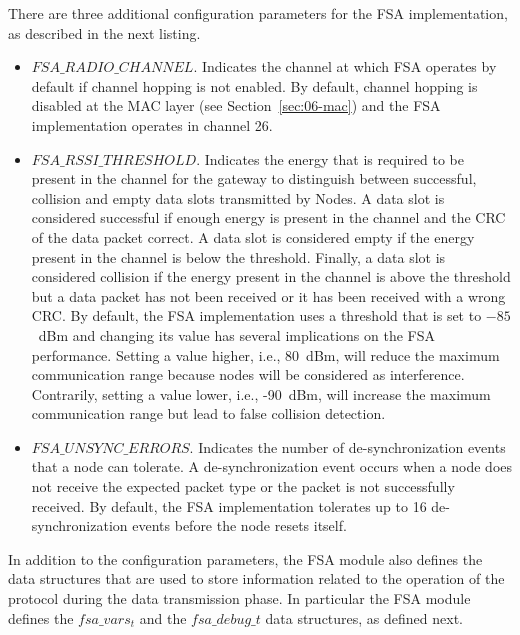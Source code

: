 There are three additional configuration parameters for the FSA implementation, as described in the next listing.
\begin{itemize}
\item $FSA\_RADIO\_CHANNEL$. Indicates the channel at which FSA operates by default if channel hopping is not enabled. By default, channel hopping is disabled at the MAC layer (see Section~\ref{sec:06-mac}) and the FSA implementation operates in channel 26.
\item $FSA\_RSSI\_THRESHOLD$. Indicates the energy that is required to be present in the channel for the gateway to distinguish between successful, collision and empty data slots transmitted by Nodes. A data slot is considered successful if enough energy is present in the channel and the CRC of the data packet correct. A data slot is considered empty if the energy present in the channel is below the threshold. Finally, a data slot is considered collision if the energy present in the channel is above the threshold but a data packet has not been received or it has been received with a wrong CRC. By default, the FSA implementation uses a threshold that is set to $-85$~dBm and changing its value has several implications on the FSA performance. Setting a value higher, i.e., 80~dBm, will reduce the maximum communication range because nodes will be considered as interference. Contrarily, setting a value lower, i.e., -90~dBm, will increase the maximum communication range but lead to false collision detection. 
\item $FSA\_UNSYNC\_ERRORS$. Indicates the number of de-synchronization events that a node can tolerate. A de-synchronization event occurs when a node does not receive the expected packet type or the packet is not successfully received. By default, the FSA implementation tolerates up to 16 de-synchronization events before the node resets itself.
\end{itemize}

In addition to the configuration parameters, the FSA module also defines the data structures that are used to store information related to the operation of the protocol during the data transmission phase. In particular the FSA module defines the $fsa\_vars_t$ and the $fsa\_debug\_t$ data structures, as defined next.

